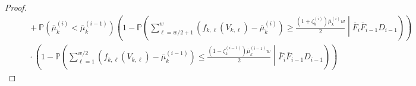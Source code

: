 \documentclass[twoside]{article}
\theoremstyle{plain}
\theoremstyle{definition}
\theoremstyle{remark}
\begin{document}
\begin{proof}
\begin{subequations}
\begin{align}
        &\hspace{20pt} + \mathbb{P}\left(\bar{\mu}^{(i)}_{k}<\bar{\mu}^{(i-1)}_{k}\right)\left(1-\mathbb{P}\left(\sum^{w}_{\ell=w/2+1}\left(f_{k,\ell}\left(V_{k,\ell}\right)-\bar{\mu}_{k}^{(i)}\right)\geq \frac{\left(1+\zeta_{k}^{(i)}\right)\bar{\mu}^{(i)}_{k}w}{2} \middle| \overline{F}_{i}\overline{F}_{i-1} D_{i-1}\right)\right)\label{eqn:sd_bound_f23}\\
        &\hspace{20pt} \cdot \left(1-\mathbb{P}\left(\sum^{w/2}_{\ell=1}\left(f_{k,\ell}\left(V_{k,\ell}\right)-\bar{\mu}_{k}^{(i-1)}\right)\leq \frac{\left(1-\zeta_{k}^{(i-1)}\right)\bar{\mu}^{(i-1)}_{k}w}{2} \middle| \overline{F}_{i}\overline{F}_{i-1} D_{i-1}\right)\right)\label{eqn:sd_bound_f24}
    \end{align}
\end{subequations}


\end{proof}
\end{document}
